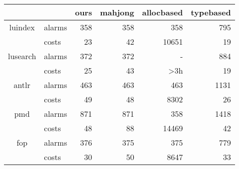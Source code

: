 \clearpage

\begin{table}[]
	\begin{tabular}{@{}clrrrr@{}}
		\toprule
		&        & \multicolumn{1}{c}{ours} & \multicolumn{1}{c}{mahjong} & \multicolumn{1}{c}{allocbased} & \multicolumn{1}{c}{typebased} \\ \midrule
		luindex    & alarms & 358                      & 358                         & 358                            & 795                           \\
		& costs  & 23                       & 42                          & 10651                          & 19                            \\\midrule
		lusearch   & alarms & 372                      & 372                         & -                               & 884                           \\
		& costs  & 25                       & 43                          & \textgreater{}3h               & 19                            \\\midrule
		antlr      & alarms & 463                      & 463                         & 463                            & 1131                          \\
		& costs  & 49                       & 48                          & 8302                           & 26                            \\\midrule
		pmd        & alarms & 871                      & 871                         & 358                            & 1418                          \\
		& costs  & 48                       & 88                          & 14469                          & 42                            \\\midrule \midrule
		fop        & alarms & 376                      & 375                         & 375                            & 779                           \\
		& costs  & 30                       & 50                          & 8647                           & 33                            \\\midrule

\end{tabular}
\end{table}
